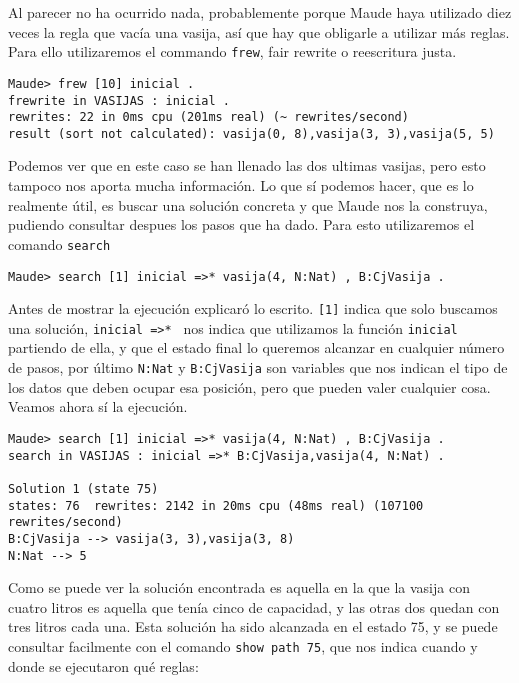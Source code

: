 Al parecer no ha ocurrido nada, probablemente porque Maude haya utilizado diez veces la regla que vacía una vasija, así que hay que obligarle a utilizar más reglas. Para ello utilizaremos el commando \texttt{frew}, fair rewrite o reescritura justa.\par

{\codesize
\begin{verbatim}
Maude> frew [10] inicial .
frewrite in VASIJAS : inicial .
rewrites: 22 in 0ms cpu (201ms real) (~ rewrites/second)
result (sort not calculated): vasija(0, 8),vasija(3, 3),vasija(5, 5)
\end{verbatim}
}

Podemos ver que en este caso se han llenado las dos ultimas vasijas, pero esto tampoco nos aporta mucha información. Lo que sí podemos hacer, que es lo realmente útil, es buscar una solución concreta y que Maude nos la construya, pudiendo consultar despues los pasos que ha dado. Para esto utilizaremos el comando \texttt{search}

{\codesize
\begin{verbatim}
Maude> search [1] inicial =>* vasija(4, N:Nat) , B:CjVasija .
\end{verbatim}
}

Antes de mostrar la ejecución explicaró lo escrito. \verb"[1]" indica que solo buscamos una solución, \verb"inicial =>* " nos indica que utilizamos la función \texttt{inicial} partiendo de ella, y que el estado final lo queremos alcanzar en cualquier número de pasos, por último \verb"N:Nat" y \verb"B:CjVasija" son variables que nos indican el tipo de los datos que deben ocupar esa posición, pero que pueden valer cualquier cosa. Veamos ahora sí la ejecución.\par

{\codesize
\begin{verbatim}
Maude> search [1] inicial =>* vasija(4, N:Nat) , B:CjVasija .
search in VASIJAS : inicial =>* B:CjVasija,vasija(4, N:Nat) .

Solution 1 (state 75)
states: 76  rewrites: 2142 in 20ms cpu (48ms real) (107100 rewrites/second)
B:CjVasija --> vasija(3, 3),vasija(3, 8)
N:Nat --> 5
\end{verbatim}
}

Como se puede ver la solución encontrada es aquella en la que la vasija con cuatro litros es aquella que tenía cinco de capacidad, y las otras dos quedan con tres litros cada una. Esta solución ha sido alcanzada en el estado 75, y se puede consultar facilmente con el comando \verb"show path 75", que nos indica cuando y donde se ejecutaron qué reglas: \par

